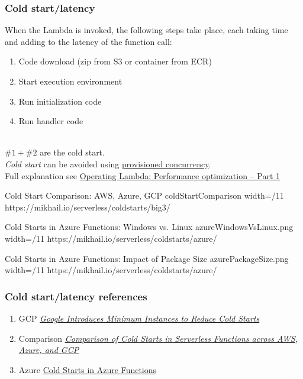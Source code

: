 \documentclass[11pt,aspectratio=169]{beamer}
\begin{document}
\begin{nrcanFrame}
  \frametitle{Cold start/latency}
  When the Lambda is invoked, the following steps take place, each taking time and adding to the latency of the function call:
  \begin{enumerate}
  \item Code download (zip from S3 or container from ECR)
  \item Start execution environment
  \item Run initialization code
  \item Run handler code
  \end{enumerate}

  \ \\
  $\#1 + \#2$ are the \alert{cold start}.\\
  \textit{Cold start} can be avoided using \href{https://docs.aws.amazon.com/lambda/latest/dg/provisioned-concurrency.html}{provisioned concurrency}.\\
  Full explanation see \href{https://aws.amazon.com/blogs/compute/operating-lambda-performance-optimization-part-1/}{Operating Lambda: Performance optimization – Part 1}
\end{nrcanFrame}

\nrcanGraphicFrame
  {Cold Start Comparison: AWS, Azure, GCP}
  {coldStartComparison}
  {width=/11}
  {https://mikhail.io/serverless/coldstarts/big3/}

  \nrcanGraphicFrame
  {Cold Starts in Azure Functions: Windows vs. Linux}
  {azureWindowsVsLinux.png}
  {width=/11}
  {https://mikhail.io/serverless/coldstarts/azure/}

  \nrcanGraphicFrame
  {Cold Starts in Azure Functions: Impact of Package Size}
  {azurePackageSize.png}
  {width=/11}
  {https://mikhail.io/serverless/coldstarts/azure/}


\begin{nrcanFrame}
  \frametitle{Cold start/latency references}
  \begin{enumerate}
  \item GCP \textit{\href{https://www.infoq.com/news/2021/09/cloud-functions-min-instances/}{Google Introduces Minimum Instances to Reduce Cold Starts}}
  \item Comparison \textit{\href{https://mikhail.io/serverless/coldstarts/big3/}{Comparison of Cold Starts in Serverless Functions across AWS, Azure, and GCP}}
  \item Azure \href{https://mikhail.io/serverless/coldstarts/azure/}{Cold Starts in Azure Functions}
  \end{enumerate}

\end{nrcanFrame}
\end{document}
